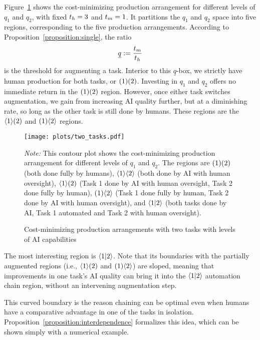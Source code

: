 \documentclass{article}
\theoremstyle{plain}
\theoremstyle{plain}
\begin{document}
Figure~\ref{fig:two_tasks} shows the cost-minimizing production arrangement for different levels of \(q_1\) and \(q_2\), with fixed \(t_{h} = 3\) and \(t_{m} = 1\).
It partitions the \(q_1\) and \(q_2\) space into five regions, corresponding to the five production arrangements.
According to Proposition~\ref{proposition:single}, the ratio 
\[
\underline{q} := \frac{t_{m}}{t_{h}}
\]
is the threshold for augmenting a task.
Interior to this \(\underline{q}\)-box, we strictly have human production for both tasks, or \(( 1 )( 2 )\).
Investing in \(q_1\) and \(q_2\) offers no immediate return in the \(( 1 )( 2 )\) region.
However, once either task switches augmentation, we gain from increasing AI quality further, but at a diminishing rate, so long as the other task is still done by humans.
These regions are the \(\langle 1 \rangle( 2 )\) and \(( 1 )\langle 2 \rangle\) regions.

\begin{figure}[h]
  \caption{Cost-minimizing production arrangements with two tasks with levels of AI capabilities} \label{fig:two_tasks}
  \begin{center}
  \texttt{[image: plots/two\_tasks.pdf]} \\
  \end{center}
\begin{footnotesize}
  \emph{Note:} This contour plot shows the cost-minimizing production arrangement for different levels of \(q_1\) and \(q_2\).
  The regions are \(( 1 )( 2 )\) (both done fully by humans), \(\langle 1 \rangle\langle 2 \rangle\) (both done by AI with human oversight), \(\langle 1 \rangle( 2 )\) (Task 1 done by AI with human oversight, Task 2 done fully by human), \(( 1 )\langle 2 \rangle\) (Task 1 done fully by human, Task 2 done by AI with human oversight), and \(\langle 1|2 \rangle\) (both tasks done by AI, Task 1 automated and Task 2 with human oversight).
\end{footnotesize}
\end{figure}

The most interesting region is \(\langle 1|2 \rangle\).
Note that its boundaries with the partially augmented regions (i.e., \(\langle 1 \rangle( 2 )\) and \(( 1 )\langle 2 \rangle\)) are sloped, meaning that improvements in one task's AI quality can bring it into the \(\langle 1|2 \rangle\) automation chain region, without an intervening augmentation step.

This curved boundary is the reason chaining can be optimal even when humans have a comparative advantage in one of the tasks in isolation.
Proposition~\ref{proposition:interdependence} formalizes this idea, which can be shown simply with a numerical example.
\end{document}
